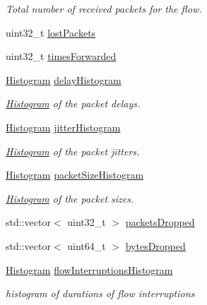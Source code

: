 \begin{DoxyCompactItemize}
\begin{DoxyCompactList}\small\item\em Total number of received packets for the flow. \end{DoxyCompactList}\item 
uint32\+\_\+t \hyperlink{structns3_1_1FlowMonitor_1_1FlowStats_a3a711adf30cb63ed20b5b3a8a9d5f5c6}{lost\+Packets}
\item 
uint32\+\_\+t \hyperlink{structns3_1_1FlowMonitor_1_1FlowStats_ad03e7c7b253052032edb33f1ac66ee75}{times\+Forwarded}
\item 
\hyperlink{classns3_1_1Histogram}{Histogram} \hyperlink{structns3_1_1FlowMonitor_1_1FlowStats_ad3db58889eb761a48e3ca0a798b5188b}{delay\+Histogram}
\begin{DoxyCompactList}\small\item\em \hyperlink{classns3_1_1Histogram}{Histogram} of the packet delays. \end{DoxyCompactList}\item 
\hyperlink{classns3_1_1Histogram}{Histogram} \hyperlink{structns3_1_1FlowMonitor_1_1FlowStats_a7fb3f521d5b8c3a4c8ce020cb5ee762d}{jitter\+Histogram}
\begin{DoxyCompactList}\small\item\em \hyperlink{classns3_1_1Histogram}{Histogram} of the packet jitters. \end{DoxyCompactList}\item 
\hyperlink{classns3_1_1Histogram}{Histogram} \hyperlink{structns3_1_1FlowMonitor_1_1FlowStats_a2a68466756299240d4cc8397498e104b}{packet\+Size\+Histogram}
\begin{DoxyCompactList}\small\item\em \hyperlink{classns3_1_1Histogram}{Histogram} of the packet sizes. \end{DoxyCompactList}\item 
std\+::vector$<$ uint32\+\_\+t $>$ \hyperlink{structns3_1_1FlowMonitor_1_1FlowStats_af510c5f6bd1958e48a7b3ad82984da43}{packets\+Dropped}
\item 
std\+::vector$<$ uint64\+\_\+t $>$ \hyperlink{structns3_1_1FlowMonitor_1_1FlowStats_af2ed6ff9bc23f2324c7400666ceec473}{bytes\+Dropped}
\item 
\hyperlink{classns3_1_1Histogram}{Histogram} \hyperlink{structns3_1_1FlowMonitor_1_1FlowStats_a9756977b7eaf7397f727f34c3ad9705a}{flow\+Interruptions\+Histogram}
\begin{DoxyCompactList}\small\item\em histogram of durations of flow interruptions \end{DoxyCompactList}\end{DoxyCompactItemize}



